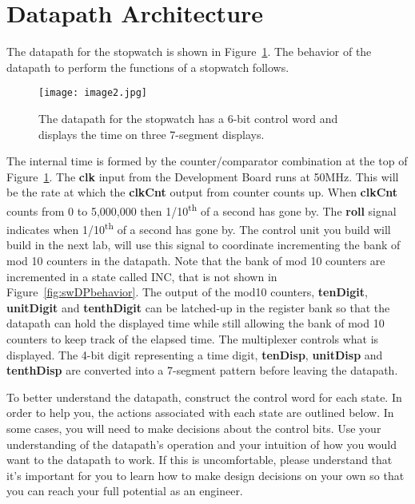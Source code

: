 \section{Datapath Architecture}

The datapath for the stopwatch is shown in Figure~\ref{fig:dpSWdatpath}. The behavior of the
datapath to perform the functions of a stopwatch follows.

\begin{figure}[ht]
\texttt{[image:  image2.jpg]}
\caption{The datapath for the stopwatch has a 6-bit control word and
displays the time on three 7-segment displays.}
\label{fig:dpSWdatpath}
\end{figure}

The internal time is formed by the counter/comparator combination at the
top of Figure~\ref{fig:dpSWdatpath}. The \textbf{clk} input from the Development Board runs
at 50MHz. This will be the rate at which the \textbf{clkCnt} output from
counter counts up. When \textbf{clkCnt} counts from 0 to 5,000,000 then
1/10\textsuperscript{th} of a second has gone by. The \textbf{roll}
signal indicates when 1/10\textsuperscript{th} of a second has gone by.
The control unit you build will build in the next lab, will use this
signal to coordinate incrementing the bank of mod 10 counters in the
datapath. Note that the bank of mod 10 counters are incremented in a
state called INC, that is not shown in Figure~\ref{fig:swDPbehavior}. The output of the mod10
counters, \textbf{tenDigit}, \textbf{unitDigit} and \textbf{tenthDigit}
can be latched-up in the register bank so that the datapath can hold the
displayed time while still allowing the bank of mod 10 counters to keep
track of the elapsed time. The multiplexer controls what is displayed.
The 4-bit digit representing a time digit, \textbf{tenDisp},
\textbf{unitDisp} and \textbf{tenthDisp} are converted into a 7-segment
pattern before leaving the datapath.

To better understand the datapath, construct the control word for each
state. In order to help you, the actions associated with each state are
outlined below. In some cases, you will need to make decisions about the
control bits. Use your understanding of the datapath's operation and
your intuition of how you would want to the datapath to work. If this is
uncomfortable, please understand that it's important for you to learn
how to make design decisions on your own so that you can reach your full
potential as an engineer.

